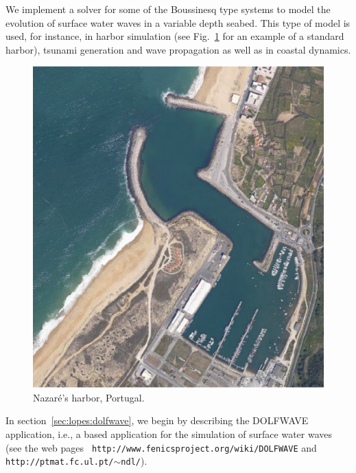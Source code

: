 We implement a solver  for some of the Boussinesq type
systems to model the evolution of surface water
waves in a variable depth seabed.  This
type of model is used, for instance, in harbor
simulation (see Fig.~\ref{fig:lopes:harbor} for an
example of a standard harbor), tsunami generation and wave
propagation as well as in coastal dynamics.
\begin{figure}
\begin{center}
\includegraphics[width=\smallfig]{chapters/lopes/pdf/nazare1.pdf}
\end{center}
\caption{Nazar\'{e}'s harbor, Portugal.}\label{fig:lopes:harbor}
\end{figure}


In section~\ref{sec:lopes:dolfwave}, we begin by describing
the DOLFWAVE application, i.e., a \fenics based
application for the simulation of surface water waves (see
the web pages {\tt
http://www.fenicsproject.org/wiki/DOLFWAVE} and {\tt
http://ptmat.fc.ul.pt/$\sim$ndl/}).

